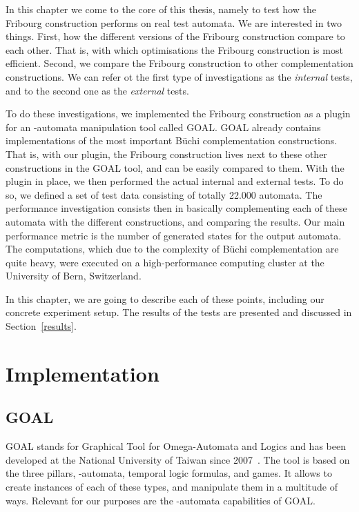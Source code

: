 
In this chapter we come to the core of this thesis, namely to test how the Fribourg construction performs on real test automata. We are interested in two things. First, how the different versions of the Fribourg construction compare to each other. That is, with which optimisations the Fribourg construction is most efficient. Second, we compare the Fribourg construction to other complementation constructions. We can refer ot the first type of investigations as the \textit{internal} tests, and to the second one as the \textit{external} tests.

To do these investigations, we implemented the Fribourg construction as a plugin for an \om-automata manipulation tool called GOAL. GOAL already contains implementations of the most important Büchi complementation constructions. That is, with our plugin, the Fribourg construction lives next to these other constructions in the GOAL tool, and can be easily compared to them. With the plugin in place, we then performed the actual internal and external tests. To do so, we defined a set of test data consisting of totally 22.000 automata. The performance investigation consists then in basically complementing each of these automata with the different constructions, and comparing the results. Our main performance metric is the number of generated states for the output automata. The computations, which due to the complexity of Büchi complementation are quite heavy, were executed on a high-performance computing cluster at the University of Bern, Switzerland.

In this chapter, we are going to describe each of these points, including our concrete experiment setup. The results of the tests are presented and discussed in Section~\ref{results}.

\section{Implementation}
\subsection{GOAL}
\label{goal}
GOAL stands for Graphical Tool for Omega-Automata and Logics and has been developed at the National University of Taiwan since 2007~\cite{2007_goal,2008_goal_ext}. The tool is based on the three pillars, \om-automata, temporal logic formulas, and games. It allows to create instances of each of these types, and manipulate them in a multitude of ways. Relevant for our purposes are the \om-automata capabilities of GOAL.

